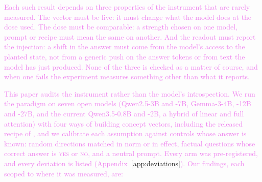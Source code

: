 \documentclass[11pt,a4paper]{article}
\newcommand{\yes}{\textup{\textsc{yes}}}
\newcommand{\no}{\textup{\textsc{no}}}
\newcommand{\draft}[1]{\textcolor{violet}{#1}}
\begin{document}
\draft{Each such result depends on three properties of the instrument that are rarely measured.
The vector must be live: it must change what the model does at the dose used. The dose must be
comparable: a strength chosen on one model, prompt or recipe must mean the same on another. And
the readout must report the injection: a shift in the answer must come from the model's access to
the planted state, not from a generic push on the answer tokens or from text the model has just
produced. None of the three is checked as a matter of course, and when one fails the experiment
measures something other than what it reports.}

\draft{This paper audits the instrument rather than the model's introspection. We run the
paradigm on seven open models (Qwen2.5-3B and -7B, Gemma-3-4B, -12B and -27B, and the current
Qwen3.5-0.8B and -2B, a hybrid of linear and full attention) with four ways of
building concept vectors, including the released recipe of \citet{macar2026mechanisms}, and we
calibrate each assumption against controls whose answer is known: random directions matched in
norm or in effect, factual questions whose correct answer is \yes{} or \no{}, and a neutral prompt.
Every arm was pre-registered, and every deviation is listed (Appendix~\ref{app:deviations}). Our
findings, each scoped to where it was measured, are:}
\end{document}

